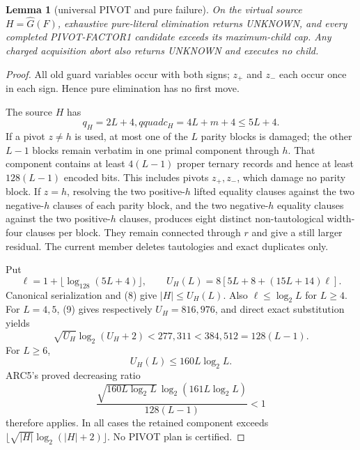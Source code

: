 \documentclass[11pt]{article}
\newtheorem{lemma}[theorem]{Lemma}
\begin{document}
\begin{lemma}[universal PIVOT and pure failure]\label{lem:fail}
On the virtual source $H=\widehat G(F)$, exhaustive pure-literal elimination
returns UNKNOWN, and every completed PIVOT-FACTOR1 candidate exceeds its
maximum-child cap.  Any charged acquisition abort also returns UNKNOWN and
executes no child.
\end{lemma}
\begin{proof}
All old guard variables occur with both signs; $z_+$ and $z_-$ each occur
once in each sign.  Hence pure elimination has no first move.

The source $H$ has
\[
 q_H=2L+4,qquad c_H=4L+m+4\le5L+4.                      \tag{8}
\]
If a pivot $z\ne h$ is used, at most one of the $L$ parity blocks is damaged;
the other $L-1$ blocks remain verbatim in one primal component through $h$.
That component contains at least $4(L-1)$ proper ternary records and hence at
least $128(L-1)$ encoded bits.  This includes pivots $z_+,z_-$, which damage
no parity block.  If $z=h$, resolving the two positive-$h$ lifted equality
clauses against the two negative-$h$ clauses of each parity block, and the
two negative-$h$ equality clauses against the two positive-$h$ clauses,
produces eight distinct non-tautological width-four clauses per block.  They
remain connected through $r$ and give a still larger residual.  The current
member deletes tautologies and exact duplicates only.

Put
\[
 \ell=1+\lfloor\log_{128}(5L+4)\rfloor,
 \qquad U_H(L)=8[5L+8+(15L+14)\ell].                    \tag{9}
\]
Canonical serialization and (8) give $|H|\le U_H(L)$.  Also
$\ell\le\log_2L$ for $L\ge4$.  For $L=4,5$, (9) gives respectively
$U_H=816,976$, and direct exact substitution yields
\[
 \sqrt{U_H}\log_2(U_H+2)<277,311<384,512=128(L-1).
\]
For $L\ge6$,
\[
 U_H(L)\le160L\log_2L.
\]
ARC5's proved decreasing ratio
\[
 \frac{\sqrt{160L\log_2L}\,
  \log_2(161L\log_2L)}{128(L-1)}<1
\]
therefore applies.  In all cases the retained component exceeds
$\lfloor\sqrt{|H|}\log_2(|H|+2)\rfloor$.  No PIVOT plan is certified.
\end{proof}
\end{document}
